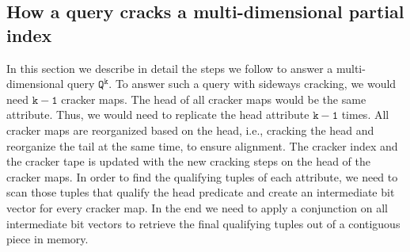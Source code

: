 \subsection{How a query cracks a multi-dimensional partial index}
\label{subsec:mcrack}




In this section we describe in detail the steps we follow to answer a multi-dimensional query $\mathtt{Q^k}$.
To answer such a query with sideways cracking, we would need $\mathtt{k-1}$ cracker maps.
The head of all cracker maps would be the same attribute.
Thus, we would need to replicate the head attribute $\mathtt{k-1}$ times.
All cracker maps are reorganized based on the head, i.e., cracking the head and reorganize the tail at the same time, to ensure alignment.
The cracker index and the cracker tape is updated with the new cracking steps on the head of the cracker maps.
In order to find the qualifying tuples of each attribute, we need to scan those tuples that qualify the head predicate and create an intermediate bit vector for every cracker map.
In the end we need to apply a conjunction on all intermediate bit vectors to retrieve the final qualifying tuples out of a contiguous piece in memory.

